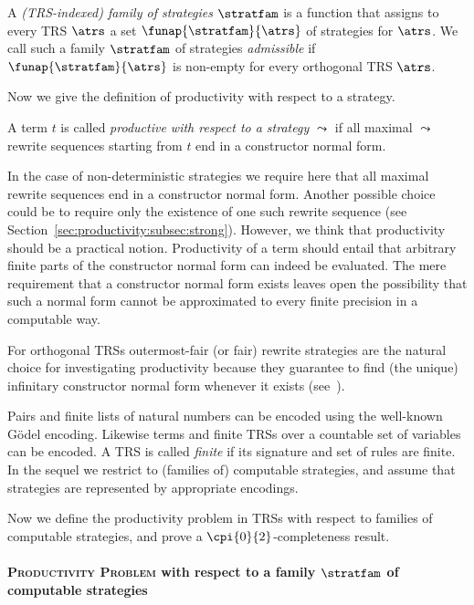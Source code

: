 \begin{definition}\normalfont
A \emph{(TRS-indexed) family of strategies $\stratfam$} 
  is a function that assigns to every TRS $\atrs$ 
  a set $\funap{\stratfam}{\atrs}$  of strategies for $\atrs$.
We call such a family $\stratfam$ of strategies \emph{admissible} 
  if $\funap{\stratfam}{\atrs}$ 
  is non-empty for every orthogonal TRS $\atrs$.
\end{definition}

\newcommand{\strategy}{\leadsto}

Now we give the definition of productivity with respect to a strategy.
\begin{definition}\normalfont\label{def:productivity}
  A term $t$ is called \emph{productive with respect to a strategy $\strategy$}
  if all maximal $\strategy$ rewrite sequences starting from $t$ end in a constructor normal form.
\end{definition}
In the case of non-deterministic strategies we require here that all maximal rewrite sequences end in a constructor normal form.
Another possible choice could be to require only the existence of 
one such rewrite sequence (see Section~\ref{sec:productivity:subsec:strong}).
However, we think that productivity should be a practical notion.
Productivity of a term should entail that arbitrary finite parts of the constructor normal form can indeed be evaluated.
The mere requirement that a constructor normal form exists
leaves open the possibility that such a normal form 
cannot be approximated to every finite precision in a computable way.

For orthogonal TRSs outermost-fair (or fair) rewrite strategies
are the natural choice for investigating productivity
because
they guarantee to find (the unique) infinitary constructor normal form whenever it exists (see~\cite{terese:2003}).

Pairs and finite lists of natural numbers can be encoded using the well-known G\"{o}del encoding.
Likewise terms and finite TRSs over a countable set of variables
can be encoded.
A TRS is called \emph{finite} if its signature and set of rules
are finite.
In the sequel we restrict to (families of) computable strategies,
and assume that strategies are represented by
appropriate encodings.

Now we define the productivity problem in TRSs with respect to families
of computable strategies, and prove a $\cpi{0}{2}$-completeness result.


\paragraph{\textsc{Productivity Problem} \normalfont 
  with respect to a family $\stratfam$ of computable strategies}\ 

